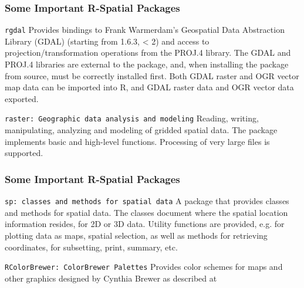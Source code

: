 	\begin{frame}
	\frametitle{Some Important R-Spatial Packages}

	\begin{block}{\texttt{rgdal}}
	Provides bindings to Frank Warmerdam's Geospatial Data Abstraction Library (GDAL) (starting from 1.6.3, < 2) and access to projection/transformation operations from the PROJ.4 library. The GDAL and PROJ.4 libraries are external to the package, and, when installing the package from source, must be correctly installed first. Both GDAL raster and OGR vector map data can be imported into R, and GDAL raster data and OGR vector data exported. 
	\end{block}

	\begin{block}{\texttt{raster: Geographic data analysis and modeling}}
	Reading, writing, manipulating, analyzing and modeling of gridded spatial data. The package implements basic and high-level functions. Processing of very large files is supported.
	\end{block}
	\end{frame}
	\begin{frame}
	\frametitle{Some Important R-Spatial Packages}

	\begin{block}{\texttt{sp: classes and methods for spatial data}}
	A package that provides classes and methods for spatial data. The classes document where the spatial location information resides, for 2D or 3D data. Utility functions are provided, e.g. for plotting data as maps, spatial selection, as well as methods for retrieving coordinates, for subsetting, print, summary, etc.
	\end{block}

	\begin{block}{\texttt{RColorBrewer: ColorBrewer Palettes}}
	Provides color schemes for maps and other graphics designed by Cynthia Brewer as described at %
	\end{block}

	\end{frame}

